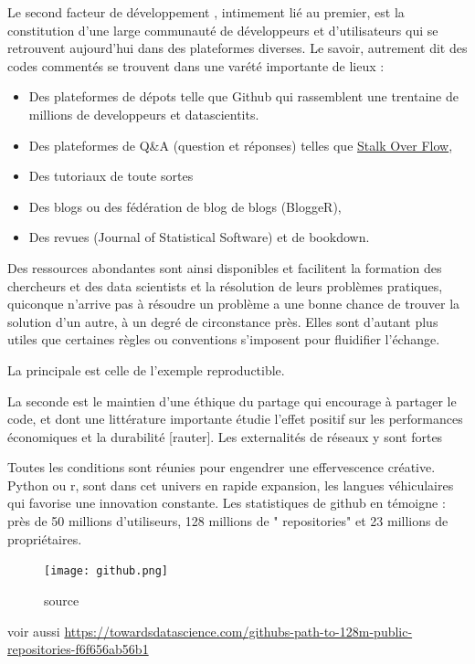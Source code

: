 \documentclass[
]{book}
\providecommand{\tightlist}{%
  \setlength{\itemsep}{0pt}\setlength{\parskip}{0pt}}
\begin{document}
Le second facteur de développement , intimement lié au premier, est la constitution d'une large communauté de développeurs et d'utilisateurs qui se retrouvent aujourd'hui dans des plateformes diverses. Le savoir, autrement dit des codes commentés se trouvent dans une varété importante de lieux :

\begin{itemize}
\tightlist
\item
  Des plateformes de dépots telle que Github qui rassemblent une trentaine de millions de developpeurs et datascientits.\\
\item
  Des plateformes de Q\&A (question et réponses) telles que \href{}{Stalk Over Flow},
\item
  Des tutoriaux de toute sortes
\item
  Des blogs ou des fédération de blog de blogs (BloggeR),
\item
  Des revues (Journal of Statistical Software) et de bookdown.
\end{itemize}

Des ressources abondantes sont ainsi disponibles et facilitent la formation des chercheurs et des data scientists et la résolution de leurs problèmes pratiques, quiconque n'arrive pas à résoudre un problème a une bonne chance de trouver la solution d'un autre, à un degré de circonstance près. Elles sont d'autant plus utiles que certaines règles ou conventions s'imposent pour fluidifier l'échange.

La principale est celle de l'exemple reproductible.

La seconde est le maintien d'une éthique du partage qui encourage à partager le code, et dont une littérature importante étudie l'effet positif sur les performances économiques et la durabilité {[}rauter{]}. Les externalités de réseaux y sont fortes

Toutes les conditions sont réunies pour engendrer une effervescence créative. Python ou r, sont dans cet univers en rapide expansion, les langues véhiculaires qui favorise une innovation constante. Les statistiques de github en témoigne : près de 50 millions d'utiliseurs, 128 millions de " repositories" et 23 millions de propriétaires.

\begin{figure}
\centering
\texttt{[image: github.png]}
\caption{source}
\end{figure}

voir aussi
\url{https://towardsdatascience.com/githubs-path-to-128m-public-repositories-f6f656ab56b1}
\end{document}
